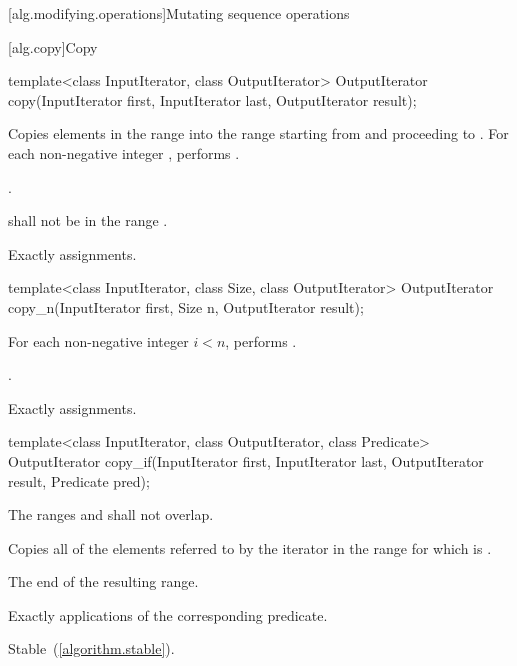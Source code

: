 [alg.modifying.operations]{Mutating sequence operations}

[alg.copy]{Copy}

%
\begin{itemdecl}
template<class InputIterator, class OutputIterator>
  OutputIterator copy(InputIterator first, InputIterator last,
                      OutputIterator result);
\end{itemdecl}

\begin{itemdescr}
\pnum
\effects Copies elements in the range  into the range  starting from  and proceeding to . For each non-negative integer , performs .

\pnum
\returns {}.

\pnum
\requires {} shall not be in the range .

\pnum
\complexity Exactly  assignments.
\end{itemdescr}

%
\begin{itemdecl}
template<class InputIterator, class Size, class OutputIterator>
  OutputIterator copy_n(InputIterator first, Size n,
                        OutputIterator result);
\end{itemdecl}


\begin{itemdescr}
\pnum
\effects For each non-negative integer
$i < n$, performs .

\pnum
\returns {}.

\pnum
\complexity Exactly  assignments.
\end{itemdescr}

%
\begin{itemdecl}
template<class InputIterator, class OutputIterator, class Predicate>
  OutputIterator copy_if(InputIterator first, InputIterator last,
                         OutputIterator result, Predicate pred);
\end{itemdecl}


\begin{itemdescr}
\pnum
\requires The ranges  and  shall not overlap.

\pnum
\effects Copies all of the elements referred to by the iterator  in the range 
for which  is .

\pnum
\returns The end of the resulting range.

\pnum
\complexity Exactly  applications of the corresponding predicate.

\pnum
\remarks Stable~(\ref{algorithm.stable}).
\end{itemdescr}


